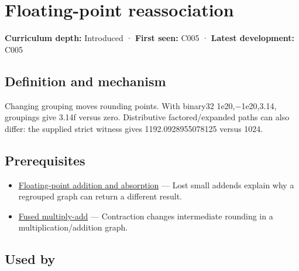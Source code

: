 \hypertarget{appendix-c2ac4a84c283}{}\label{referencestart:appendix-c2ac4a84c283}
\section{Floating-point reassociation}\label{appendix-c2ac4a84c283-floating-point-reassociation}

\hypertarget{appendix-c2ac4a84c283-floating-point-reassociation}{}

\textbf{Curriculum depth:} Introduced · \textbf{First seen:} C005 · \textbf{Latest development:} C005

\begin{allmightroledefinition}

\subsection{Definition and mechanism}\label{appendix-c2ac4a84c283-definition-and-mechanism}

\hypertarget{appendix-c2ac4a84c283-definition-and-mechanism}{}

Changing grouping moves rounding points. With binary32 1e20,−1e20,3.14, groupings give 3.14f versus zero. Distributive factored/expanded paths can also differ: the supplied strict witness gives 1192.0928955078125 versus 1024.

\end{allmightroledefinition}

\subsection{Prerequisites}\label{appendix-c2ac4a84c283-prerequisites}

\hypertarget{appendix-c2ac4a84c283-prerequisites}{}

\begin{itemize}
\tightlist
\item
  \hyperref[appendix-a1b1b4580dfd]{Floating-point addition and absorption} --- Lost small addends explain why a regrouped graph can return a different result.
\item
  \hyperref[appendix-41e8ef22a21e]{Fused multiply-add} --- Contraction changes intermediate rounding in a multiplication/addition graph.
\end{itemize}

\subsection{Used by}\label{appendix-c2ac4a84c283-used-by}


